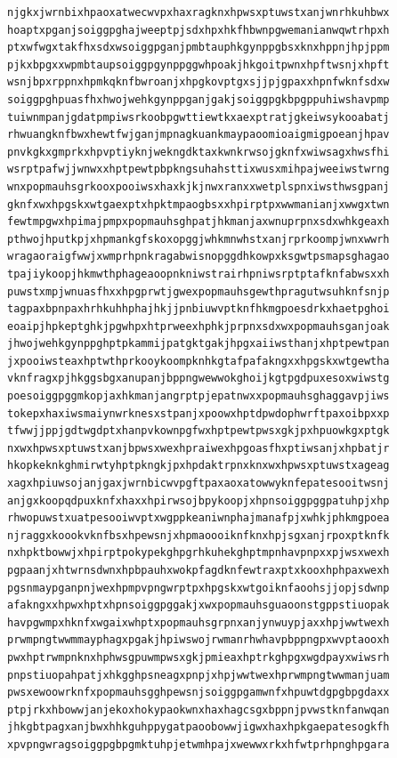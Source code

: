 \documentclass[11pt,letterpaper]{exam}
\begin{document}
\begin{questions}
\begin{verbatim}
njgkxjwrnbixhpaoxatwecwvpxhaxragknxhpwsxptuwstxanjwnrhkuhbwx
hoaptxpganjsoiggpghajweeptpjsdxhpxhkfhbwnpgwemanianwqwtrhpxh
ptxwfwgxtakfhxsdxwsoiggpganjpmbtauphkgynppgbsxknxhppnjhpjppm
pjkxbpgxxwpmbtaupsoiggpgynppggwhpoakjhkgoitpwnxhpftwsnjxhpft
wsnjbpxrppnxhpmkqknfbwroanjxhpgkovptgxsjjpjgpaxxhpnfwknfsdxw
soiggpghpuasfhxhwojwehkgynppganjgakjsoiggpgkbpgppuhiwshavpmp
tuiwnmpanjgdatpmpiwsrkoobpgwttiewtkxaexptratjgkeiwsykooabatj
rhwuangknfbwxhewtfwjganjmpnagkuankmaypaoomioaigmigpoeanjhpav
pnvkgkxgmprkxhpvptiyknjwekngdktaxkwnkrwsojgknfxwiwsagxhwsfhi
wsrptpafwjjwnwxxhptpewtpbpkngsuhahsttixwusxmihpajweeiwstwrng
wnxpopmauhsgrkooxpooiwsxhaxkjkjnwxranxxwetplspnxiwsthwsgpanj
gknfxwxhpgskxwtgaexptxhpktmpaogbsxxhpirptpxwwmanianjxwwgxtwn
fewtmpgwxhpimajpmpxpopmauhsghpatjhkmanjaxwnuprpnxsdxwhkgeaxh
pthwojhputkpjxhpmankgfskoxopggjwhkmnwhstxanjrprkoompjwnxwwrh
wragaoraigfwwjxwmprhpnkragabwisnopggdhkowpxksgwtpsmapsghagao
tpajiykoopjhkmwthphageaoopnkniwstrairhpniwsrptptafknfabwsxxh
puwstxmpjwnuasfhxxhpgprwtjgwexpopmauhsgewthpragutwsuhknfsnjp
tagpaxbpnpaxhrhkuhhphajhkjjpnbiuwvptknfhkmgpoesdrkxhaetpghoi
eoaipjhpkeptghkjpgwhpxhtprweexhphkjprpnxsdxwxpopmauhsganjoak
jhwojwehkgynppghptpkammijpatgktgakjhpgxaiiwsthanjxhptpewtpan
jxpooiwsteaxhptwthprkooykoompknhkgtafpafakngxxhpgskxwtgewtha
vknfragxpjhkggsbgxanupanjbppngwewwokghoijkgtpgdpuxesoxwiwstg
poesoiggpggmkopjaxhkmanjangrptpjepatnwxxpopmauhsghaggavpjiws
tokepxhaxiwsmaiynwrknesxstpanjxpoowxhptdpwdophwrftpaxoibpxxp
tfwwjjppjgdtwgdptxhanpvkownpgfwxhptpewtpwsxgkjpxhpuowkgxptgk
nxwxhpwsxptuwstxanjbpwsxwexhpraiwexhpgoasfhxptiwsanjxhpbatjr
hkopkeknkghmirwtyhptpkngkjpxhpdaktrpnxknxwxhpwsxptuwstxageag
xagxhpiuwsojanjgaxjwrnbicwvpgftpaxaoxatowwyknfepatesooitwsnj
anjgxkoopqdpuxknfxhaxxhpirwsojbpykoopjxhpnsoiggpggpatuhpjxhp
rhwopuwstxuatpesooiwvptxwgppkeaniwnphajmanafpjxwhkjphkmgpoea
njraggxkoookvknfbsxhpewsnjxhpmaoooiknfknxhpjsgxanjrpoxptknfk
nxhpktbowwjxhpirptpokypekghpgrhkuhekghptmpnhavpnpxxpjwsxwexh
pgpaanjxhtwrnsdwnxhpbpauhxwokpfagdknfewtraxptxkooxhphpaxwexh
pgsnmaypganpnjwexhpmpvpngwrptpxhpgskxwtgoiknfaoohsjjopjsdwnp
afakngxxhpwxhptxhpnsoiggpggakjxwxpopmauhsguaoonstgppstiuopak
havpgwmpxhknfxwgaixwhptxpopmauhsgrpnxanjynwuypjaxxhpjwwtwexh
prwmpngtwwmmayphagxpgakjhpiwswojrwmanrhwhavpbppngpxwvptaooxh
pwxhptrwmpnknxhphwsgpuwmpwsxgkjpmieaxhptrkghpgxwgdpayxwiwsrh
pnpstiuopahpatjxhkgghpsneagxpnpjxhpjwwtwexhprwmpngtwwmanjuam
pwsxewoowrknfxpopmauhsgghpewsnjsoiggpgamwnfxhpuwtdgpgbpgdaxx
ptpjrkxhbowwjanjekoxhokypaokwnxhaxhagcsgxbppnjpvwstknfanwqan
jhkgbtpagxanjbwxhhkguhppygatpaoobowwjigwxhaxhpkgaepatesogkfh
xpvpngwragsoiggpgbpgmktuhpjetwmhpajxwewwxrkxhfwtprhpnghpgara

\end{verbatim}
\end{questions}
\end{document}
